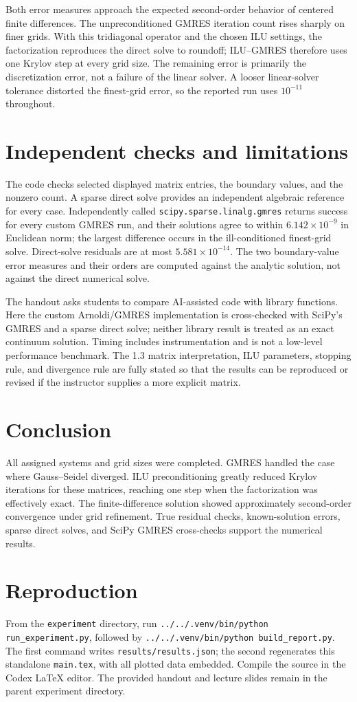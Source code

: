 \documentclass[a4paper,11pt]{article}
\begin{document}
Both error measures approach the expected second-order behavior of centered finite differences. The unpreconditioned GMRES iteration count rises sharply on finer grids. With this tridiagonal operator and the chosen ILU settings, the factorization reproduces the direct solve to roundoff; ILU--GMRES therefore uses one Krylov step at every grid size. The remaining error is primarily the discretization error, not a failure of the linear solver. A looser linear-solver tolerance distorted the finest-grid error, so the reported run uses $10^{-11}$ throughout.

\section{Independent checks and limitations}
The code checks selected displayed matrix entries, the boundary values, and the nonzero count. A sparse direct solve provides an independent algebraic reference for every case. Independently called \texttt{scipy.sparse.linalg.gmres} returns success for every custom GMRES run, and their solutions agree to within $6.142\times10^{-9}$ in Euclidean norm; the largest difference occurs in the ill-conditioned finest-grid solve. Direct-solve residuals are at most $5.581\times10^{-14}$. The two boundary-value error measures and their orders are computed against the analytic solution, not against the direct numerical solve.

The handout asks students to compare AI-assisted code with library functions. Here the custom Arnoldi/GMRES implementation is cross-checked with SciPy's GMRES and a sparse direct solve; neither library result is treated as an exact continuum solution. Timing includes instrumentation and is not a low-level performance benchmark. The 1.3 matrix interpretation, ILU parameters, stopping rule, and divergence rule are fully stated so that the results can be reproduced or revised if the instructor supplies a more explicit matrix.

\section{Conclusion}
All assigned systems and grid sizes were completed. GMRES handled the case where Gauss--Seidel diverged. ILU preconditioning greatly reduced Krylov iterations for these matrices, reaching one step when the factorization was effectively exact. The finite-difference solution showed approximately second-order convergence under grid refinement. True residual checks, known-solution errors, sparse direct solves, and SciPy GMRES cross-checks support the numerical results.

\appendix
\section{Reproduction}
From the \texttt{experiment} directory, run \texttt{../../.venv/bin/python run\_experiment.py}, followed by \texttt{../../.venv/bin/python build\_report.py}. The first command writes \texttt{results/results.json}; the second regenerates this standalone \texttt{main.tex}, with all plotted data embedded. Compile the source in the Codex LaTeX editor. The provided handout and lecture slides remain in the parent experiment directory.
\end{document}
